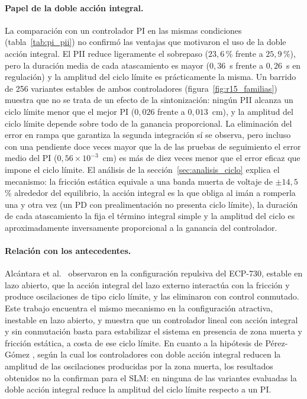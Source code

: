 \paragraph{Papel de la doble acción integral.}
La comparación con un controlador PI en las mismas condiciones (tabla~\ref{tab:pi_pii}) no confirmó las ventajas que motivaron el uso de la doble acción integral. El PII reduce ligeramente el sobrepaso ($23{,}6$\,\% frente a $25{,}9$\,\%), pero la duración media de cada atascamiento es mayor ($0{,}36$~s frente a $0{,}26$~s en regulación) y la amplitud del ciclo límite es prácticamente la misma. Un barrido de 256 variantes estables de ambos controladores (figura~\ref{fig:r15_familias}) muestra que no se trata de un efecto de la sintonización: ningún PII alcanza un ciclo límite menor que el mejor PI ($0{,}026$ frente a $0{,}013$~cm), y la amplitud del ciclo límite depende sobre todo de la ganancia proporcional. La eliminación del error en rampa que garantiza la segunda integración sí se observa, pero incluso con una pendiente doce veces mayor que la de las pruebas de seguimiento el error medio del PI ($0{,}56\times10^{-3}$~cm) es más de diez veces menor que el error eficaz que impone el ciclo límite. El análisis de la sección~\ref{sec:analisis_ciclo} explica el mecanismo: la fricción estática equivale a una banda muerta de voltaje de $\pm14{,}5$\,\% alrededor del equilibrio, la acción integral es la que obliga al imán a romperla una y otra vez (un PD con prealimentación no presenta ciclo límite), la duración de cada atascamiento la fija el término integral simple y la amplitud del ciclo es aproximadamente inversamente proporcional a la ganancia del controlador.

\paragraph{Relación con los antecedentes.}
Alcántara et al.\ \cite{alcantara} observaron en la configuración repulsiva del ECP-730, estable en lazo abierto, que la acción integral del lazo externo interactúa con la fricción y produce oscilaciones de tipo ciclo límite, y las eliminaron con control conmutado. Este trabajo encuentra el mismo mecanismo en la configuración atractiva, inestable en lazo abierto, y muestra que un controlador lineal con acción integral y sin conmutación basta para estabilizar el sistema en presencia de zona muerta y fricción estática, a costa de ese ciclo límite. En cuanto a la hipótesis de Pérez-Gómez \cite{perez}, según la cual los controladores con doble acción integral reducen la amplitud de las oscilaciones producidas por la zona muerta, los resultados obtenidos no la confirman para el SLM: en ninguna de las variantes evaluadas la doble acción integral reduce la amplitud del ciclo límite respecto a un PI.


